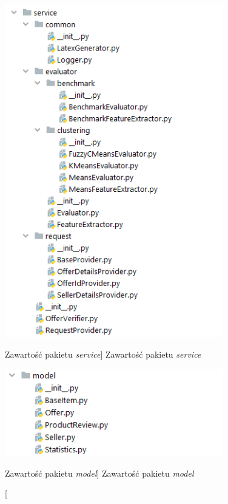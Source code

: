 \documentclass[../Kamil_Kowalewski_Main.tex]{subfiles}
\begin{document}
{{{            \begin{figure}[H]
                \centering
                \begin{minipage}[b]{0.45\textwidth}
                    \centering
                    \includegraphics[width=0.85\textwidth, keepaspectratio]
                    {img/chapter4/service_package.png}
                    \caption
                    [Zawartość pakietu \textit{service}]
                    {Zawartość pakietu \textit{service}}
                    \label{fig:chapter4:srodowisko_eksperymentalne:service_package}
                \end{minipage}
                \hfill
                \begin{minipage}[b]{0.45\textwidth}
                    \centering
                    \includegraphics[width=0.85\textwidth, keepaspectratio]
                    {img/chapter4/model_package.png}
                    \caption
                    [Zawartość pakietu \textit{model}]
                    {Zawartość pakietu \textit{model}}
                    \label{fig:chapter4:srodowisko_eksperymentalne:model_package}
                \end{minipage}
            \end{figure}

}}}
\end{document}
